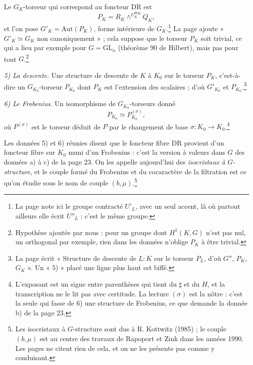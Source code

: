 \documentclass[11pt,a4paper]{article}
\begin{document}
Le $G_K$-torseur qui correspond au foncteur $\mathrm{DR}$ est
\[
P_K = R_K \wedge^{U^{\mathrm{Hdg}}_K} Q_K ,
\]
et l'on pose $G'_K = \mathrm{Aut}(P_K)$, forme intérieure de $G_K$.\footnote{La
page note ici le groupe contracté $U'_L$, avec un seul accent, là où partout
ailleurs elle écrit $U''_L$ ; c'est le même groupe.} La page ajoute
« $G'_K \simeq G_K$ non canoniquement » ; cela suppose que le torseur $P_K$
soit trivial, ce qui a lieu par exemple pour $G = \mathrm{GL}_n$ (théorème 90
de Hilbert), mais pas pour tout $G$.\footnote{Hypothèse ajoutée par nous : pour
un groupe dont $H^1(K, G)$ n'est pas nul, un orthogonal par exemple, rien dans
les données n'oblige $P_K$ à être trivial.}

\emph{5) La descente.} Une structure de descente de $K$ à $K_0$ sur le
torseur $P_K$, c'est-à-dire un $G_{K_0}$-torseur $P_{K_0}$ dont $P_K$ est
l'extension des scalaires ; d'où $G'_{K_0}$ et $P_{K_0}$.\footnote{La page
écrit « Structure de descente de $L : K$ sur le torseur $P_L$, d'où $G''$,
$P_K$, $G_K$ ». Un « 5) » placé une ligne plus haut est biffé.}

\emph{6) Le Frobenius.} Un isomorphisme de $G_{K_0}$-torseurs donné
\[
P_{K_0} \simeq P_{K_0}^{(\sigma)},
\]
où $P^{(\sigma)}$ est le torseur déduit de $P$ par le changement de base
$\sigma : K_0 \to K_0$.\footnote{L'exposant est un signe entre parenthèses
qui tient du $\sharp$ et du $H$, et la transcription ne le lit pas avec
certitude. La lecture $(\sigma)$ est la nôtre : c'est la seule qui fasse de 6)
une structure de Frobenius, ce que demande la donnée b) de la page 23.}

Les données 5) et 6) réunies disent que le foncteur fibre $\mathrm{DR}$ provient
d'un foncteur fibre sur $K_0$ muni d'un Frobenius : c'est la version à
valeurs dans $G$ des données a) à c) de la page 23. On les appelle aujourd'hui
des \emph{isocristaux à $G$-structure}, et le couple formé du Frobenius et du
cocaractère de la filtration est ce qu'on étudie sous le nom de couple
$(b, \mu)$.\footnote{Les isocristaux à $G$-structure sont dus à R. Kottwitz
(1985) ; le couple $(b, \mu)$ est au centre des travaux de Rapoport et Zink
dans les années 1990. Les pages ne citent rien de cela, et on ne les
présente pas comme y conduisant.}
\end{document}
